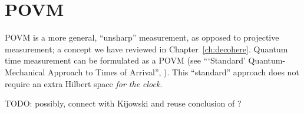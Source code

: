 \section{POVM}\label{sec:hist:povm}

POVM is
a more general, ``unsharp'' measurement, as opposed to projective measurement;
a concept we have reviewed in Chapter~\ref{ch:decohere}.
Quantum time measurement can be formulated as a POVM
(see ```Standard' Quantum-Mechanical Approach to Times of Arrival'', \cite[Ch. 10]{TQM1}).
This ``standard'' approach does not require an extra Hilbert space \emph{for the clock}.

TODO: possibly, connect with Kijowski and reuse conclusion of \cite[Sec. 4.1.1]{TQM2}?
